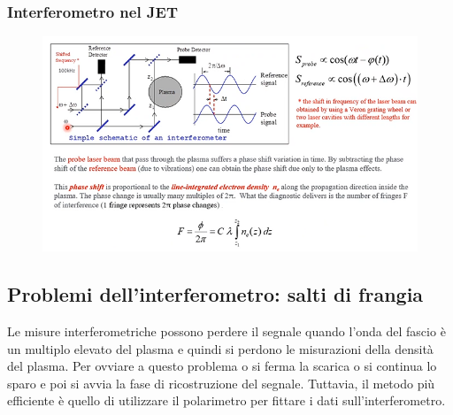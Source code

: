 \documentclass{article}
\begin{document}
 \subsubsection{Interferometro nel JET}
 \begin{figure}
     \includegraphics[scale=0.4]{2022-05-29-16-23-12.png}%
 \end{figure}
 \subsection{Problemi dell'interferometro: salti di frangia}
 Le misure interferometriche possono perdere il segnale quando l'onda del fascio è un multiplo elevato del plasma e quindi si perdono le misurazioni della densità del plasma. Per ovviare a questo problema o si ferma la scarica o si continua lo sparo e poi si avvia la fase di ricostruzione del segnale. Tuttavia, il metodo più efficiente è quello di utilizzare il polarimetro per fittare i dati sull'interferometro.
\end{document}
